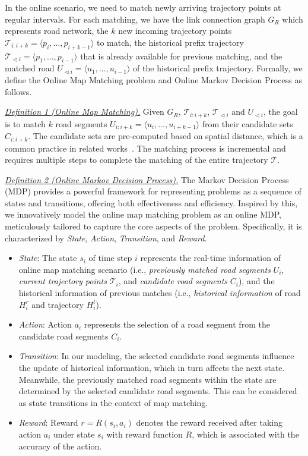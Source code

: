 \noindent In the online scenario, we need to match newly arriving trajectory points at regular intervals. For each matching, we have the link connection graph $G_R$ which represents road network, the $k$ new incoming trajectory points $\mathcal{T}_{i:i+k}= \langle p_i, \ldots, p_{i+k-1} \rangle$ to match, the historical prefix trajectory $\mathcal{T}_{\vartriangleleft i} = \langle p_1, \ldots, p_{i-1} \rangle$ that is already available for previous matching, and the matched road $U_{\vartriangleleft i} = \langle u_1, \ldots, u_{i-1} \rangle$ of the historical prefix trajectory. Formally, we define the Online Map Matching problem and Online Markov Decision Process as follows.

\textit{\underline{Definition 1 (Online Map Matching).}} Given $G_R$, $\mathcal{T}_{i:i+k}$, $\mathcal{T}_{\vartriangleleft i}$ and $U_{\vartriangleleft i}$, the goal is to match $k$ road segments $U_{i:i+k} = \langle u_i, \ldots, u_{i+k-1} \rangle$ from their candidate sets $C_{i:i+k}$. The candidate sets are pre-computed based on spatial distance, which is a common practice in related works~\cite{HMM,AMM, mtrajrec}. The matching process is incremental and requires multiple steps to complete the matching of the entire trajectory $\mathcal{T}$.

\textit{\underline{Definition 2 (Online Markov Decision Process).}} The Markov Decision Process (MDP) provides a powerful framework for representing problems as a sequence of states and transitions, offering both effectiveness and efficiency. Inspired by this, we innovatively model the online map matching problem as an online MDP, meticulously tailored to capture the core aspects of the problem. Specifically, it is characterized by \textit{State}, \textit{Action}, \textit{Transition}, and \textit{Reward}.
\begin{itemize}[leftmargin=10.2pt]
\setlength{\itemsep}{0pt}
\setlength{\parsep}{0pt}
\setlength{\parskip}{0pt}
\item \textit{State}: The state $s_i$ of time step $i$ represents the real-time information of online map matching scenario (i.e., \textit{previously matched road segments} $U_i$, \textit{current trajectory points} $\mathcal{T}_i$, and \textit{candidate road segments} $C_i$), and the historical information of previous matches (i.e., \textit{historical information} of road $H_i^r$ and trajectory $H_i^t$). 

\item \textit{Action}: Action $a_i$ represents the selection of a road segment from the candidate road segments $C_i$. 
\item \textit{Transition}: In our modeling, the selected candidate road segments influence the update of historical information, which in turn affects the next state. Meanwhile, the previously matched road segments within the state are determined by the selected candidate road segments. This can be considered as state transitions in the context of map matching.
\item \textit{Reward}: Reward $r = R(s_i, a_i)$ denotes the reward received after taking action $a_i$ under state $s_i$ with reward function $R$, which is associated with the accuracy of the action.
\end{itemize}

